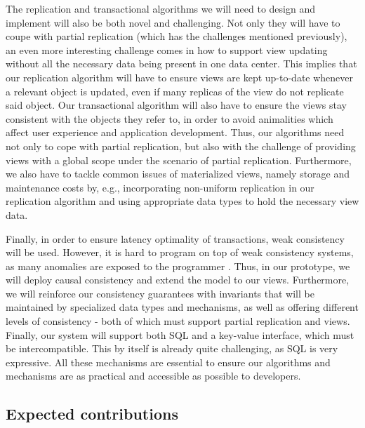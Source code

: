 The replication and transactional algorithms we will need to design and implement will also be both novel and challenging.
Not only they will have to coupe with partial replication (which has the challenges mentioned previously), an even more interesting challenge comes in how to support view updating without all the necessary data being present in one data center.
This implies that our replication algorithm will have to ensure views are kept up-to-date whenever a relevant object is updated, even if many replicas of the view do not replicate said object.
Our transactional algorithm will also have to ensure the views stay consistent with the objects they refer to, in order to avoid animalities which affect user experience and application development.
Thus, our algorithms need not only to cope with partial replication, but also with the challenge of providing views with a global scope under the scenario of partial replication.
Furthermore, we also have to tackle common issues of materialized views, namely storage and maintenance costs by, e.g., incorporating non-uniform replication in our replication algorithm and using appropriate data types to hold the necessary view data.

Finally, in order to ensure latency optimality of transactions, weak consistency \cite{understandingEC, session, cops, dynamo, walter} will be used.
However, it is hard to program on top of weak consistency systems, as many anomalies are exposed to the programmer \cite{understandingEC}. 
Thus, in our prototype, we will deploy causal consistency \cite{cure, saturn} and extend the model to our views.
Furthermore, we will reinforce our consistency guarantees with invariants that will be maintained by specialized data types and mechanisms, as well as offering different levels of consistency - both of which must support partial replication and views.
Finally, our system will support both SQL \cite{sequel} and a key-value interface, which must be intercompatible.
This by itself is already quite challenging, as SQL is very expressive. 
All these mechanisms are essential to ensure our algorithms and mechanisms are as practical and accessible as possible to developers.


\subsection{Expected contributions}

